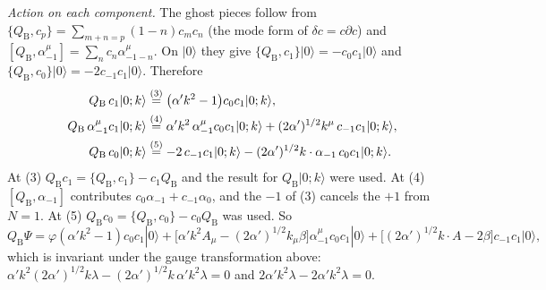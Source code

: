 \begin{tcolorbox}[breakable]
\begin{remark}
		\emph{Action on each component.} The ghost pieces follow from $\{Q_{\mathrm B},c_p\}=\sum_{m+n=p}(1-n)c_mc_n$ (the mode form of $\delta c=c\partial c$) and $[Q_{\mathrm B},\alpha^\mu_{-1}]=\sum_nc_n\alpha^\mu_{-1-n}$. On $|0\rangle$ they give $\{Q_{\mathrm B},c_1\}|0\rangle=-c_0c_1|0\rangle$ and $\{Q_{\mathrm B},c_0\}|0\rangle=-2c_{-1}c_1|0\rangle$. Therefore
		\begin{align*}
			Q_{\mathrm B}\,c_1|0;k\rangle&\overset{(3)}{=}\bigl(\alpha'k^2-1\bigr)c_0c_1|0;k\rangle,\\
			Q_{\mathrm B}\,\alpha^\mu_{-1}c_1|0;k\rangle&\overset{(4)}{=}\alpha'k^2\,\alpha^\mu_{-1}c_0c_1|0;k\rangle+(2\alpha')^{1/2}k^\mu\,c_{-1}c_1|0;k\rangle,\\
			Q_{\mathrm B}\,c_0|0;k\rangle&\overset{(5)}{=}-2\,c_{-1}c_1|0;k\rangle-(2\alpha')^{1/2}k\cdot\alpha_{-1}\,c_0c_1|0;k\rangle .
		\end{align*}
		At (3) $Q_{\mathrm B}c_1=\{Q_{\mathrm B},c_1\}-c_1Q_{\mathrm B}$ and the result for $Q_{\mathrm B}|0;k\rangle$ were used. At (4) $[Q_{\mathrm B},\alpha_{-1}]$ contributes $c_0\alpha_{-1}+c_{-1}\alpha_0$, and the $-1$ of (3) cancels the $+1$ from $N=1$. At (5) $Q_{\mathrm B}c_0=\{Q_{\mathrm B},c_0\}-c_0Q_{\mathrm B}$ was used. So
		\begin{equation*}
			Q_{\mathrm B}\Psi=\varphi(\alpha'k^2-1)c_0c_1|0\rangle+\bigl[\alpha'k^2A_\mu-(2\alpha')^{1/2}k_\mu\beta\bigr]\alpha^\mu_{-1}c_0c_1|0\rangle+\bigl[(2\alpha')^{1/2}k\cdot A-2\beta\bigr]c_{-1}c_1|0\rangle ,
		\end{equation*}
		which is invariant under the gauge transformation above: $\alpha'k^2(2\alpha')^{1/2}k\lambda-(2\alpha')^{1/2}k\,\alpha'k^2\lambda=0$ and $2\alpha'k^2\lambda-2\alpha'k^2\lambda=0$.


\end{remark}
\end{tcolorbox}
